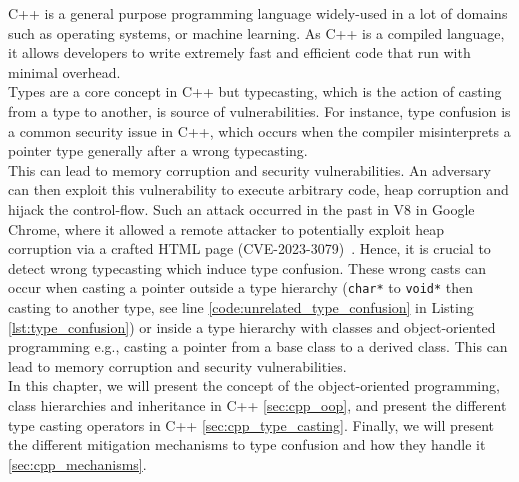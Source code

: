 \documentclass[a4paper,11pt,oneside]{report}
\begin{document}
C++ is a general purpose 
programming language widely-used in a lot of domains
such as operating systems, or machine learning. As C++ is a compiled language, it
allows developers to write extremely fast and efficient code
that run with minimal overhead. \\ Types are a core concept in C++
but typecasting, which is the action of casting from a type to another,
is source of vulnerabilities. For instance, type confusion is a common
security issue in C++, which occurs when the compiler misinterprets a pointer
type generally after a wrong typecasting.\\ This can lead to memory corruption
and security vulnerabilities. An adversary can then exploit this vulnerability
to execute arbitrary code, heap corruption and hijack the control-flow.  Such an
attack occurred in the past in V8 in Google Chrome, where it allowed a remote
attacker to potentially exploit heap corruption via a crafted HTML page
(CVE-2023-3079)~\cite{nist}. Hence, it is crucial to detect wrong typecasting which induce
type confusion.  These wrong casts can occur when casting a pointer outside a
type hierarchy (\texttt{char*} to \texttt{void*} then casting to another type,
see line \ref{code:unrelated_type_confusion} in Listing
\autoref{lst:type_confusion}) or inside a type hierarchy with classes and
object-oriented programming e.g., casting a pointer from a base class to a
derived class. This can lead to memory corruption and security
vulnerabilities. \\
In this chapter, we will present the concept of the object-oriented
programming, class hierarchies and inheritance in C++ \autoref{sec:cpp_oop}, and
present the different type casting operators in C++
\autoref{sec:cpp_type_casting}.  Finally, we will present the different
mitigation mechanisms to type confusion and how they handle it \autoref{sec:cpp_mechanisms}.
\end{document}
